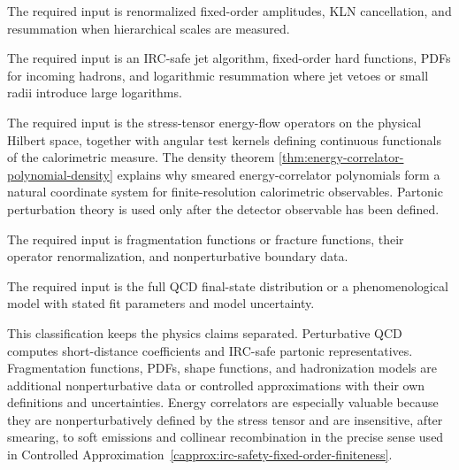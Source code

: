 \begin{description}[style=nextline,leftmargin=1.5em]
\item[Total inclusive rates and IRC-safe event shapes.]
The required input is renormalized fixed-order amplitudes, KLN cancellation,
and resummation when hierarchical scales are measured.

\item[IRC-safe jet cross sections.]
The required input is an IRC-safe jet algorithm, fixed-order hard functions,
PDFs for incoming hadrons, and logarithmic resummation where jet vetoes or
small radii introduce large logarithms.

\item[Energy correlators.]
The required input is the stress-tensor energy-flow operators on the physical
Hilbert space, together with angular test kernels defining continuous
functionals of the calorimetric measure.  The density theorem
\ref{thm:energy-correlator-polynomial-density} explains why smeared
energy-correlator polynomials form a natural coordinate system for
finite-resolution calorimetric observables.  Partonic perturbation theory is
used only after the detector observable has been defined.

\item[Identified hadron spectra.]
The required input is fragmentation functions or fracture functions, their
operator renormalization, and nonperturbative boundary data.

\item[Fully exclusive hadronization patterns.]
The required input is the full QCD final-state distribution or a
phenomenological model with stated fit parameters and model uncertainty.
\end{description}

This classification keeps the physics claims separated.  Perturbative QCD
computes short-distance coefficients and IRC-safe partonic representatives.
Fragmentation functions, PDFs, shape functions, and hadronization models are
additional nonperturbative data or controlled approximations with their own
definitions and uncertainties.  Energy correlators are especially valuable
because they are nonperturbatively defined by the stress tensor and are
insensitive, after smearing, to soft emissions and collinear recombination in
the precise sense used in
Controlled Approximation~\ref{capprox:irc-safety-fixed-order-finiteness}.
